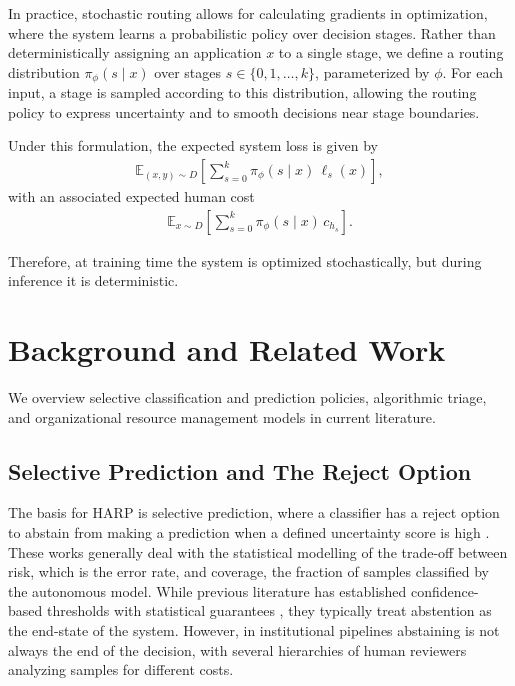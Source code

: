 \documentclass[conference]{IEEEtran}
\begin{document}
In practice, stochastic routing allows for calculating gradients in optimization, where 
the system learns a probabilistic policy over decision stages. Rather than deterministically 
assigning an application $x$ to a single stage, we define 
a routing distribution $\pi_\phi(s \mid x)$ over stages $s \in \{0,1,\dots,k\}$, 
parameterized by $\phi$. For each input, a stage is sampled according to this distribution, 
allowing the routing policy to express uncertainty and to smooth decisions near stage boundaries.

Under this formulation, the expected system loss is given by
\begin{align}
\mathbb{E}_{(x,y)\sim D}
\left[
\sum_{s=0}^k \pi_\phi(s \mid x)\,\ell_s(x)
\right],
\end{align}
with an associated expected human cost
\begin{align}
\mathbb{E}_{x\sim D}
\left[
\sum_{s=0}^k \pi_\phi(s \mid x)\,c_{h_s}
\right].
\end{align}

Therefore, at training time the system is optimized stochastically, but during inference it is
deterministic.

\section{Background and Related Work}

We overview selective classification and prediction policies, algorithmic triage, 
and organizational resource management models in current literature. 

\subsection{Selective Prediction and The Reject Option}

The basis for HARP is selective prediction, where a classifier has a reject option to abstain from making a 
prediction when a defined uncertainty score is high \cite{elyaniv2010}. These works generally deal with the 
statistical modelling of the trade-off between risk, which is the error rate, and coverage, the fraction of samples
classified by the autonomous model. While previous literature has established confidence-based thresholds with 
statistical guarantees \cite{geifman2017}, they typically treat abstention as the end-state of the system. However,
in institutional pipelines abstaining is not always the end of the decision, with several hierarchies of human 
reviewers analyzing samples for different costs.
\end{document}
